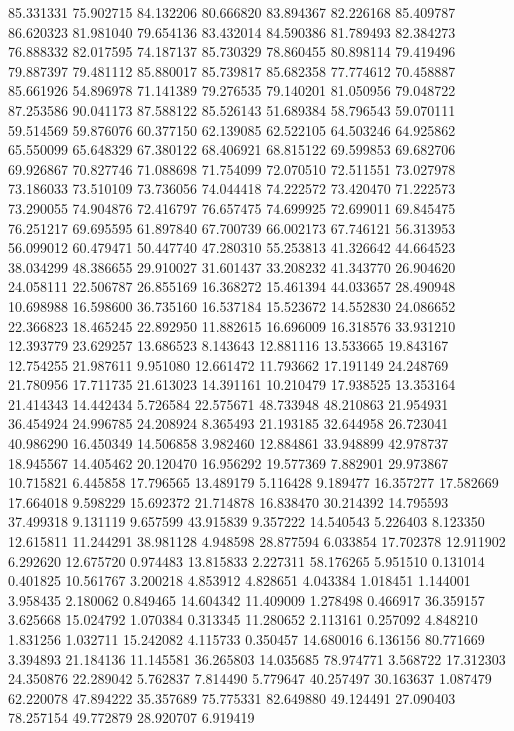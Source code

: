 85.331331
75.902715
84.132206
80.666820
83.894367
82.226168
85.409787
86.620323
81.981040
79.654136
83.432014
84.590386
81.789493
82.384273
76.888332
82.017595
74.187137
85.730329
78.860455
80.898114
79.419496
79.887397
79.481112
85.880017
85.739817
85.682358
77.774612
70.458887
85.661926
54.896978
71.141389
79.276535
79.140201
81.050956
79.048722
87.253586
90.041173
87.588122
85.526143
51.689384
58.796543
59.070111
59.514569
59.876076
60.377150
62.139085
62.522105
64.503246
64.925862
65.550099
65.648329
67.380122
68.406921
68.815122
69.599853
69.682706
69.926867
70.827746
71.088698
71.754099
72.070510
72.511551
73.027978
73.186033
73.510109
73.736056
74.044418
74.222572
73.420470
71.222573
73.290055
74.904876
72.416797
76.657475
74.699925
72.699011
69.845475
76.251217
69.695595
61.897840
67.700739
66.002173
67.746121
56.313953
56.099012
60.479471
50.447740
47.280310
55.253813
41.326642
44.664523
38.034299
48.386655
29.910027
31.601437
33.208232
41.343770
26.904620
24.058111
22.506787
26.855169
16.368272
15.461394
44.033657
28.490948
10.698988
16.598600
36.735160
16.537184
15.523672
14.552830
24.086652
22.366823
18.465245
22.892950
11.882615
16.696009
16.318576
33.931210
12.393779
23.629257
13.686523
8.143643
12.881116
13.533665
19.843167
12.754255
21.987611
9.951080
12.661472
11.793662
17.191149
24.248769
21.780956
17.711735
21.613023
14.391161
10.210479
17.938525
13.353164
21.414343
14.442434
5.726584
22.575671
48.733948
48.210863
21.954931
36.454924
24.996785
24.208924
8.365493
21.193185
32.644958
26.723041
40.986290
16.450349
14.506858
3.982460
12.884861
33.948899
42.978737
18.945567
14.405462
20.120470
16.956292
19.577369
7.882901
29.973867
10.715821
6.445858
17.796565
13.489179
5.116428
9.189477
16.357277
17.582669
17.664018
9.598229
15.692372
21.714878
16.838470
30.214392
14.795593
37.499318
9.131119
9.657599
43.915839
9.357222
14.540543
5.226403
8.123350
12.615811
11.244291
38.981128
4.948598
28.877594
6.033854
17.702378
12.911902
6.292620
12.675720
0.974483
13.815833
2.227311
58.176265
5.951510
0.131014
0.401825
10.561767
3.200218
4.853912
4.828651
4.043384
1.018451
1.144001
3.958435
2.180062
0.849465
14.604342
11.409009
1.278498
0.466917
36.359157
3.625668
15.024792
1.070384
0.313345
11.280652
2.113161
0.257092
4.848210
1.831256
1.032711
15.242082
4.115733
0.350457
14.680016
6.136156
80.771669
3.394893
21.184136
11.145581
36.265803
14.035685
78.974771
3.568722
17.312303
24.350876
22.289042
5.762837
7.814490
5.779647
40.257497
30.163637
1.087479
62.220078
47.894222
35.357689
75.775331
82.649880
49.124491
27.090403
78.257154
49.772879
28.920707
6.919419
